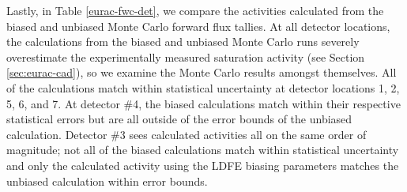Lastly, in Table \ref{eurac-fwc-det}, we compare the activities calculated from
the biased and unbiased Monte Carlo forward flux tallies. At all
detector locations, the calculations from the biased and unbiased Monte Carlo runs severely
overestimate the experimentally measured saturation activity (see Section \ref{sec:eurac-cad}), 
so we examine the Monte Carlo results amongst themselves. All of the calculations match within
statistical uncertainty at detector locations 1, 2, 5, 6, and 7. At detector \#4, the biased
calculations match within their respective statistical errors but are all outside of the error
bounds of the unbiased calculation. Detector \#3 sees calculated activities all on the same order
of magnitude; not all of the biased calculations match within statistical uncertainty and only
the calculated activity using the LDFE biasing parameters matches the unbiased calculation within
error bounds.

